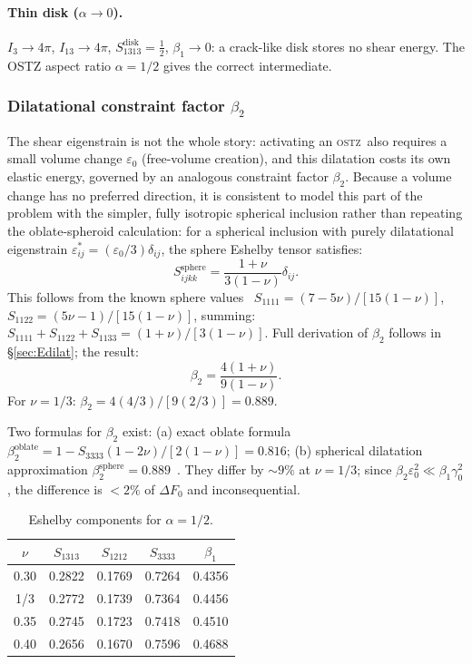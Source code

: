 \documentclass[5p,sort&compress]{elsarticle}
\newcommand{\OSTZ}{\textsc{ostz}}
\newcommand{\dF}{\Delta F_0}
\newcommand{\gz}{\gamma_0}
\newcommand{\half}{\tfrac{1}{2}}
\begin{document}
\paragraph{Thin disk ($\alpha\to0$).}
$I_3\to4\pi$, $I_{13}\to4\pi$, $S_{1313}^\text{disk}=\half$,
$\beta_1\to0$: a crack-like disk stores no shear energy.
The OSTZ aspect ratio $\alpha=1/2$ gives the correct intermediate.

\subsubsection{Dilatational constraint factor $\beta_2$}
\label{sec:beta2}

The shear eigenstrain is not the whole story: activating an \OSTZ\
also requires a small volume change $\varepsilon_0$ (free-volume
creation), and this dilatation costs its own elastic energy,
governed by an analogous constraint factor $\beta_2$. Because a
volume change has no preferred direction, it is consistent to model
this part of the problem with the simpler, fully isotropic spherical
inclusion rather than repeating the oblate-spheroid calculation: for
a spherical inclusion with purely dilatational eigenstrain
$\varepsilon^*_{ij}=(\varepsilon_0/3)\delta_{ij}$, the sphere Eshelby
tensor satisfies:
\begin{equation}
  S_{ijkk}^\text{sphere}=\frac{1+\nu}{3(1-\nu)}\delta_{ij}.
  \label{eq:Sijkk}
\end{equation}
This follows from the known sphere values~\cite{mura1987}
$S_{1111}=(7-5\nu)/[15(1-\nu)]$,
$S_{1122}=(5\nu-1)/[15(1-\nu)]$, summing:
$S_{1111}+S_{1122}+S_{1133}=(1+\nu)/[3(1-\nu)]$. Full derivation
of $\beta_2$ follows in \S\ref{sec:Edilat}; the result:
\begin{equation}
  \boxed{\beta_2=\frac{4(1+\nu)}{9(1-\nu)}.}
  \label{eq:beta2}
\end{equation}
For $\nu=1/3$: $\beta_2=4(4/3)/[9(2/3)]=0.889$.

Two formulas for $\beta_2$ exist: (a) exact oblate formula
$\beta_2^\text{oblate}=1-S_{3333}(1-2\nu)/[2(1-\nu)]=0.816$;
(b) spherical dilatation approximation $\beta_2^\text{sphere}=0.889$~\cite{pad-part1}.
They differ by $\sim9\%$ at $\nu=1/3$;
since $\beta_2\varepsilon_0^2\ll\beta_1\gz^2$, the difference is
$<2\%$ of $\dF$ and inconsequential.

\begin{table}[htbp]
\centering
\small
\caption{Eshelby components for $\alpha=1/2$.}
\label{tab:eshelby}
\begin{tabular}{ccccc}
\toprule
$\nu$ & $S_{1313}$ & $S_{1212}$ & $S_{3333}$ & $\beta_1$\\
\midrule
0.30 & 0.2822 & 0.1769 & 0.7264 & 0.4356\\
1/3  & 0.2772 & 0.1739 & 0.7364 & 0.4456\\
0.35 & 0.2745 & 0.1723 & 0.7418 & 0.4510\\
0.40 & 0.2656 & 0.1670 & 0.7596 & 0.4688\\
\bottomrule
\end{tabular}
\end{table}
\end{document}
